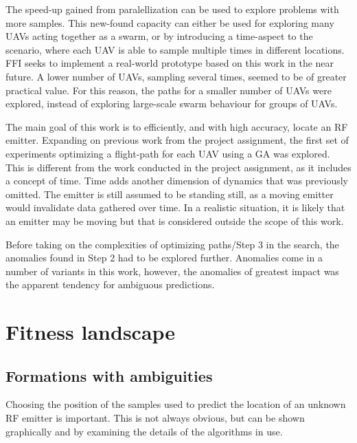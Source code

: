\documentclass[10pt,a4paper]{book}
\begin{document}
The speed-up gained from paralellization can be used to explore problems with more samples. This new-found capacity can either be used for exploring many \glspl{UAV} acting together as a swarm, or by introducing a time-aspect to the scenario, where each \gls{UAV} is able to sample multiple times in different locations. \Gls{FFI} seeks to implement a real-world prototype based on this work in the near future. A lower number of \glspl{UAV}, sampling several times, seemed to be of greater practical value. For this reason, the paths for a smaller number of \glspl{UAV} were explored, instead of exploring large-scale swarm behaviour for groups of \glspl{UAV}.

The main goal of this work is to efficiently, and with high accuracy, locate an \gls{RF} emitter. Expanding on previous work from the project assignment, the first set of experiments optimizing a flight-path for each \gls{UAV} using a \gls{GA} was explored. This is different from the work conducted in the project assignment, as it includes a concept of time. Time adds another dimension of dynamics that was previously omitted. The emitter is still assumed to be standing still, as a moving emitter would invalidate data gathered over time. In a realistic situation, it is likely that an emitter may be moving but that is considered outside the scope of this work. 

Before taking on the complexities of optimizing paths/Step 3 in the search, the anomalies found in Step 2 had to be explored further. Anomalies come in a number of variants in this work, however, the anomalies of greatest impact was the apparent tendency for ambiguous predictions.

\newpage

\section{Fitness landscape}
\label{RA_FL}


\subsection{Formations with ambiguities}
\label{results_ambiguities}

Choosing the position of the samples used to predict the location of an unknown \gls{RF} emitter is important. This is not always obvious, but can be shown graphically and by examining the details of the algorithms in use.
\end{document}
